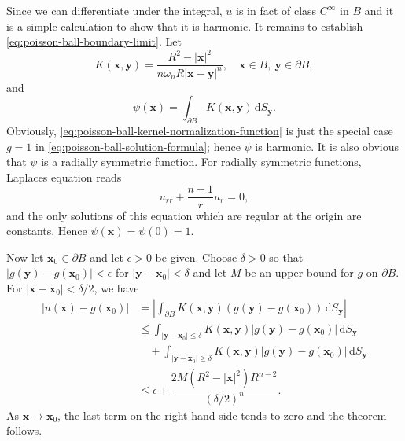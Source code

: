 \begin{Proof}
Since we can differentiate under the integral, $u$ is in fact of class $C^\infty$ in $B$ and it is a simple calculation to show that it is harmonic. It remains to establish \eqref{eq:poisson-ball-boundary-limit}. Let
\begin{equation}\label{eq:poisson-ball-kernel}
K(\bm{x},\bm{y})=\dfrac{R^2-|\bm{x}|^2}{n\omega_nR|\bm{x}-\bm{y}|^n},\quad\bm{x}\in B,\ \bm{y}\in\partial B,
\end{equation}
and
\begin{equation}\label{eq:poisson-ball-kernel-normalization-function}
\psi(\bm{x})=\int_{\partial B}K(\bm{x},\bm{y})\,\mathrm{d}S_{\bm{y}}.
\end{equation}
Obviously, \eqref{eq:poisson-ball-kernel-normalization-function} is just the special case $g=1$ in \eqref{eq:poisson-ball-solution-formula}; hence $\psi$ is harmonic. It is also obvious that $\psi$ is a radially symmetric function. For radially symmetric functions, Laplace\textquotesingle s equation reads
\begin{equation}\label{eq:radial-laplace-equation}
u_{rr}+\dfrac{n-1}{r}u_r=0,
\end{equation}
and the only solutions of this equation which are regular at the origin are constants. Hence $\psi(\bm{x})=\psi(0)=1$.

Now let $\bm{x}_0\in\partial B$ and let $\epsilon>0$ be given. Choose $\delta>0$ so that $|g(\bm{y})-g(\bm{x}_0)|<\epsilon$ for $|\bm{y}-\bm{x}_0|<\delta$ and let $M$ be an upper bound for $g$ on $\partial B$. For $|\bm{x}-\bm{x}_0|<\delta/2$, we have
\begin{equation}\label{eq:poisson-ball-boundary-estimate}
\begin{aligned}
|u(\bm{x})-g(\bm{x}_0)|
&=\left|\int_{\partial B}K(\bm{x},\bm{y})(g(\bm{y})-g(\bm{x}_0))\,\mathrm{d}S_{\bm{y}}\right|\\
&\leq\int_{|\bm{y}-\bm{x}_0|\leq\delta}K(\bm{x},\bm{y})|g(\bm{y})-g(\bm{x}_0)|\,\mathrm{d}S_{\bm{y}}\\
&\quad+\int_{|\bm{y}-\bm{x}_0|\geq\delta}K(\bm{x},\bm{y})|g(\bm{y})-g(\bm{x}_0)|\,\mathrm{d}S_{\bm{y}}\\
&\leq\epsilon+\dfrac{2M(R^2-|\bm{x}|^2)R^{n-2}}{(\delta/2)^n}.
\end{aligned}
\end{equation}
As $\bm{x}\to\bm{x}_0$, the last term on the right-hand side tends to zero and the theorem follows.
\end{Proof}
